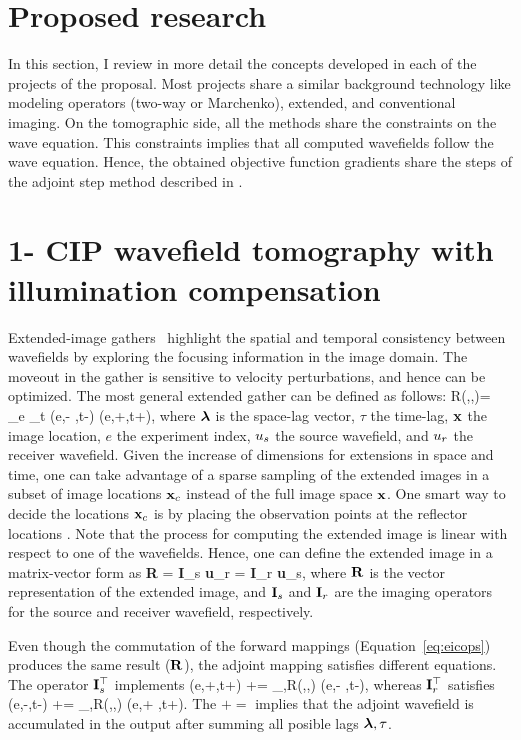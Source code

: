 \newpage
\section{Proposed research}

In this section, I review in more detail the concepts developed in each 
of the projects of the proposal. Most projects share a similar background
technology like modeling operators (two-way or Marchenko), extended, and 
conventional imaging. On the tomographic side, all the methods
share the constraints on the wave equation. This constraints implies that all
computed wavefields follow the wave equation. Hence,  the 
obtained objective function gradients share the steps of the adjoint step method 
described in \cite{plessix}.  

\section{1- CIP wavefield tomography with illumination compensation}

Extended-image gathers~\citep{rickett:883,SavaVasconselos}
highlight the spatial and temporal consistency between wavefields by exploring
 the focusing information in the image domain. 
 The moveout in the gather is sensitive to
velocity perturbations, and hence can be optimized. The most
general extended gather can be defined as follows:
\beq
R(\xx,\hh,\tau)= \sum_{{e}} \sum_{t} \US({e},\xx - \hh,t-\tau) \UR({e},\xx+\hh,t+\tau),
\label{eq:eic}
\eeq
 where ${\boldsymbol{\lambda}}$ is the space-lag vector, $\tau$ the time-lag, ${\bf x}$ the image location, $e$ the
experiment index, $u_s$ the 
 source wavefield, and $u_r$ the receiver wavefield. Given the increase of dimensions 
for extensions in space and time, one can take advantage of a sparse sampling 
of the extended images in a subset of image locations ${\bf x}_c$ instead of the full image space ${\bf x}$. One smart
way to  decide the locations ${\bf x}_c$ is by placing the observation points at the reflector
locations \citep{cullison}.  
 Note that the process for computing the extended
image is linear with respect to one of the wavefields. Hence, one can 
define the extended image in a matrix-vector form as 
\beq
  {\bf R} = {\bf I}_{s} {\bf u}_r = {\bf I}_{r} {\bf u}_s,
\label{eq:eicops}
\eeq
where $\bf R$ is the vector representation of the extended image, and 
 ${\bf I}_s$ and ${\bf I}_r$ are the imaging operators for the source and receiver wavefield,
respectively. 

Even though the commutation of the forward mappings (Equation~\ref{eq:eicops})
 produces the same result ($\bf R$), the adjoint 
mapping satisfies different equations. The operator ${\bf I}_s^\top$ implements
\beq
  \tilde{\UR}(e,\xx+\hh,t+\tau) += \sum_{\tau,\hh}R(\xx,\hh,\tau) \US(e,\xx - \hh,t-\tau),
\label{eq:adj1}
\eeq
whereas ${\bf I}_r^\top$ satisfies
\beq
  \tilde{\US}(e,\xx-\hh,t-\tau) += \sum_{\tau,\hh}R(\xx,\hh,\tau) \UR(e,\xx + \hh,t+\tau).
\eeq
The $+=$ implies that the adjoint wavefield is accumulated in the output after
summing all posible lags ${\boldsymbol{\lambda}},\tau$.


